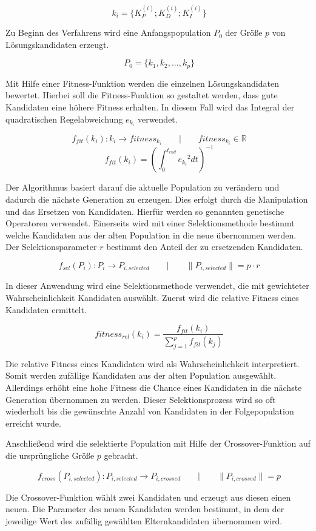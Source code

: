 \documentclass{article}
\begin{document}
\[\ k_i = \{ K_P^{(i)};K_D^{(i)};K_I^{(i)}\} \]

Zu Beginn des Verfahrens wird eine Anfangspopulation $P_0$ der Größe $p$ von Lösungskandidaten erzeugt.

\[\ P_0 = \{k_1, k_2,...,k_p\} \]

Mit Hilfe einer Fitness-Funktion werden die einzelnen Lösungskandidaten bewertet. Hierbei soll die Fitness-Funktion so gestaltet werden, dass gute Kandidaten eine höhere Fitness erhalten. In diesem Fall wird das Integral der quadratischen Regelabweichung $e_{k_i}$ verwendet.

\[\ f_{fit}(k_i) : k_i \rightarrow fitness_{k_i} \qquad \vert \qquad fitness_{k_i} \in \mathbb{R} \]
\[\ f_{fit}(k_i) = ( { \int_0^{t_{end}} {e_{k_i}}^2 dt } )^{-1} \]

Der Algorithmus basiert darauf die aktuelle Population zu verändern und dadurch die nächste Generation zu erzeugen. Dies erfolgt durch die Manipulation und das Ersetzen von Kandidaten. Hierfür werden so genannten genetische Operatoren verwendet. Einerseits wird mit einer Selektionsmethode bestimmt welche Kandidaten aus der alten Population in die neue übernommen werden. Der Selektionsparameter $r$ bestimmt den Anteil der zu ersetzenden Kandidaten.

\[\ f_{sel}(P_i) : P_i \rightarrow P_{i, selected} \qquad \vert \qquad \|P_{i, selected} \| = p \cdot r \]

In dieser Anwendung wird eine Selektionsmethode verwendet, die mit gewichteter Wahrscheinlichkeit Kandidaten auswählt. Zuerst wird die relative Fitness eines Kandidaten ermittelt.

\[\ fitness_{rel}(k_i) = \frac{f_{fit}(k_i)}{\sum_{j=1}^p f_{fit}(k_j)} \]

Die relative Fitness eines Kandidaten wird als Wahrscheinlichkeit interpretiert. Somit werden zufällige Kandidaten aus der alten Population ausgewählt. Allerdings erhöht eine hohe Fitness die Chance eines Kandidaten in die nächste Generation übernommen zu werden. Dieser Selektionsprozess wird so oft wiederholt bis die gewünschte Anzahl von Kandidaten in der Folgepopulation erreicht wurde.

Anschließend wird die selektierte Population mit Hilfe der Crossover-Funktion auf die ursprüngliche Größe $p$ gebracht.

\[\ f_{cross}(P_{i,selected}) : P_{i,selected} \rightarrow P_{i,crossed} \qquad
\vert \qquad \| P_{i,crossed} \| = p \]

Die Crossover-Funktion wählt zwei Kandidaten und erzeugt aus diesen einen neuen. Die Parameter des neuen Kandidaten werden bestimmt, in dem der jeweilige Wert des zufällig gewählten Elternkandidaten übernommen wird.
\end{document}
